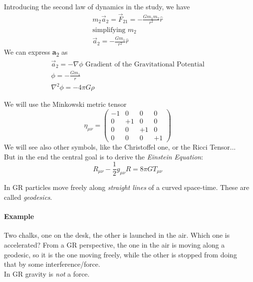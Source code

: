 \bigskip

Introducing the second law of dynamics in the study, we have
\begin{gather*}
m_{2}\vec{a}_{2} = \vec{F}_{21} = - \frac{Gm_{1}m_{2}}{r^{2}} \hat{r} \\
\text{simplifying } m_{2} \\
\vec{a}_{2} = - \frac{Gm_{1}}{r^{2}} \hat{r}  
\end{gather*}
We can express \textbf{a}\textsubscript{2} as 
\begin{gather*}
	\vec{a}_{2} = - \nabla \phi \text{ Gradient of the Gravitational Potential} \\
	\phi = - \frac{Gm_{1}}{r} \\
	\nabla^{2} \phi = -4\pi G \rho
\end{gather*}

We will use the Minkowski metric tensor 
\begin{equation}
	\eta_{\mu\nu} =
	\begin{pmatrix}
		-1 & 0 & 0 & 0 \\
		0 & +1 & 0 & 0 \\
		0 & 0 & +1 & 0 \\
		0 & 0 & 0 & +1 
	\end{pmatrix}
\end{equation}
 We will see also other symbols, like the Christoffel one, or the Ricci Tensor... \\
 But in the end the central goal is to derive the \emph{Einstein Equation}:
\begin{equation}
R_{\mu\nu} - \frac{1}{2} g_{\mu\nu}R = 8\pi G T_{\mu\nu}
\end{equation}

In GR particles move freely along \emph{straight lines} of a curved space-time. These are called \emph{geodesics}.

\paragraph{Example}
Two chalks, one on the desk, the other is launched in the air. Which one is accelerated?
From a GR perspective, the one in the air is moving along a geodesic, so it is the one moving freely, while the other is stopped from doing that by some interference/force. \\
In GR gravity is \emph{not} a force. 
